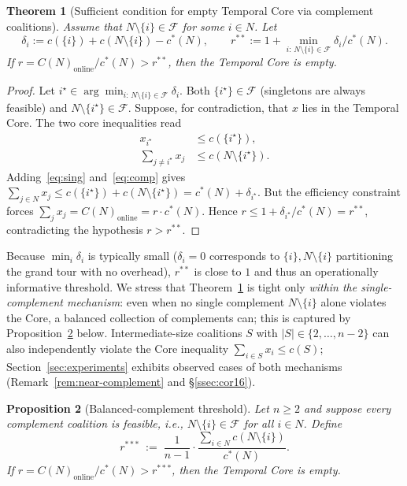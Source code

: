 \documentclass[11pt]{article}
\theoremstyle{plain}
\newtheorem{theorem}{Theorem}
\newtheorem{proposition}[theorem]{Proposition}
\theoremstyle{definition}
\theoremstyle{remark}
\newcommand{\F}{\mathcal{F}}
\newcommand{\cstar}{c^{\ast}}
\begin{document}
\begin{theorem}[Sufficient condition for empty Temporal Core via complement coalitions]
\label{thm:empty-core}
Assume that $N\setminus\{i\}\in\F$ for some $i\in N$. Let
\[
\delta_i := c(\{i\}) + c(N\setminus\{i\}) - \cstar(N),\qquad r^{\ast\ast}:= 1 + \min_{i:\,N\setminus\{i\}\in\F} \delta_i/\cstar(N).
\]
If $r = C(N)_{\text{online}}/\cstar(N) > r^{\ast\ast}$, then the Temporal Core is empty.
\end{theorem}

\begin{proof}
Let $i^{\star}\in\arg\min_{i:\,N\setminus\{i\}\in\F} \delta_i$. Both $\{i^{\star}\}\in\F$ (singletons are always feasible) and $N\setminus\{i^{\star}\}\in\F$. Suppose, for contradiction, that $x$ lies in the Temporal Core. The two core inequalities read
\begin{align}
x_{i^{\star}} &\le c(\{i^{\star}\}), \label{eq:sing}\\
\sum_{j\neq i^{\star}} x_j &\le c(N\setminus\{i^{\star}\}).\label{eq:comp}
\end{align}
Adding~\eqref{eq:sing} and~\eqref{eq:comp} gives $\sum_{j\in N} x_j \le c(\{i^{\star}\}) + c(N\setminus\{i^{\star}\}) = \cstar(N) + \delta_{i^{\star}}$. But the efficiency constraint forces $\sum_j x_j = C(N)_{\text{online}} = r\cdot \cstar(N)$. Hence $r\le 1 + \delta_{i^{\star}}/\cstar(N) = r^{\ast\ast}$, contradicting the hypothesis $r>r^{\ast\ast}$.
\end{proof}

Because $\min_i \delta_i$ is typically small ($\delta_i=0$ corresponds to $\{i\},N\setminus\{i\}$ partitioning the grand tour with no overhead), $r^{\ast\ast}$ is close to $1$ and thus an operationally informative threshold. We stress that Theorem~\ref{thm:empty-core} is tight only \emph{within the single-complement mechanism}: even when no single complement $N\setminus\{i\}$ alone violates the Core, a balanced collection of complements can; this is captured by Proposition~\ref{prop:bondareva-complement} below. Intermediate-size coalitions $S$ with $|S|\in\{2,\ldots,n-2\}$ can also independently violate the Core inequality $\sum_{i\in S} x_i \le c(S)$; Section~\ref{sec:experiments} exhibits observed cases of both mechanisms (Remark~\ref{rem:near-complement} and \S\ref{ssec:cor16}).

\begin{proposition}[Balanced-complement threshold]
\label{prop:bondareva-complement}
Let $n\ge 2$ and suppose every complement coalition is feasible, i.e., $N\setminus\{i\}\in\F$ for all $i\in N$. Define
\[
r^{\ast\ast\ast} \;:=\; \frac{1}{n-1}\cdot\frac{\sum_{i\in N} c(N\setminus\{i\})}{\cstar(N)}.
\]
If $r = C(N)_{\text{online}}/\cstar(N) > r^{\ast\ast\ast}$, then the Temporal Core is empty.
\end{proposition}
\end{document}
